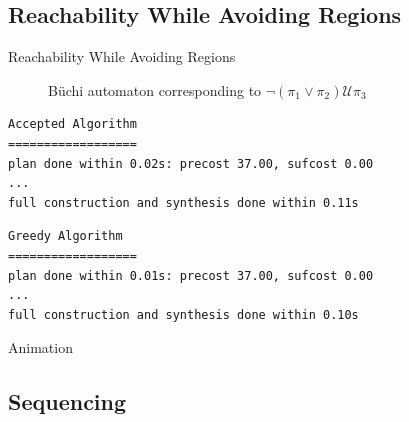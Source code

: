 \documentclass{beamer}
\newcommand{\U}{\bm{\mathcal{U}}}
\begin{document}
\subsection{Reachability While Avoiding Regions}
\begin{frame}[fragile]{Reachability While Avoiding Regions}
\begin{figure}
\centering
{}
\caption{\footnotesize B\"{u}chi automaton corresponding to $\neg (\pi_1 \lor \pi_2 ) \U \pi_{3}$}
\end{figure}

\begingroup
\fontsize{8pt}{12pt}\selectfont
\begin{lstlisting}
Accepted Algorithm
==================
plan done within 0.02s: precost 37.00, sufcost 0.00
...
full construction and synthesis done within 0.11s
\end{lstlisting}
\endgroup
\begingroup
\fontsize{8pt}{12pt}\selectfont
\begin{lstlisting}
Greedy Algorithm
==================
plan done within 0.01s: precost 37.00, sufcost 0.00
...
full construction and synthesis done within 0.10s 
\end{lstlisting}
\endgroup



\end{frame}

\begin{frame}{Animation}
\end{frame}

\subsection{Sequencing}
\end{document}
